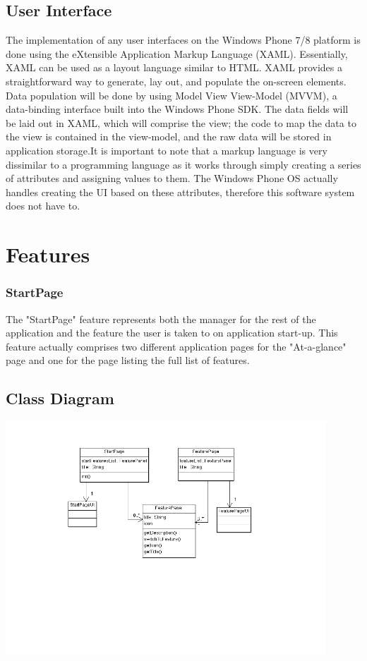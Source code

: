 \documentclass[pdftex,12pt,letter]{article}
\begin{document}
\subsection{User Interface}
The implementation of any user interfaces on the Windows Phone 7/8 platform is done using the eXtensible Application Markup Language (XAML). Essentially, XAML can be used as a layout language similar to HTML. XAML provides a straightforward way to generate, lay out, and populate the on-screen elements. Data population will be done by using Model View View-Model (MVVM), a data-binding interface built into the Windows Phone SDK. The data fields will be laid out in XAML, which will comprise the view; the code to map the data to the view is contained in the view-model, and the raw data will be stored in application storage.It is important to note that a markup language is very dissimilar to a programming language as it works through simply creating a series of attributes and assigning values to them. The Windows Phone OS actually handles creating the UI based on these attributes, therefore this software system does not have to.
\\
\section{Features}
\subsubsection{StartPage}
The "StartPage" feature represents both the manager for the rest of the application and the feature the user is taken to on application start-up. This feature actually comprises two different application pages for the "At-a-glance" page and one for the page listing the full list of features.
\subsection{Class Diagram}
\includegraphics[width=120mm]{StartPageCD.png}
\end{document}
